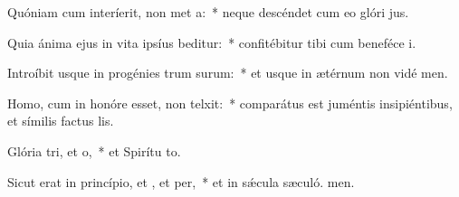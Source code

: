 \item Quóniam cum interíerit, non met a:~* neque descéndet cum eo glóri jus.
\item Quia ánima ejus in vita ipsíus beditur:~* confitébitur tibi cum beneféce i.
\item Introíbit usque in progénies trum surum:~* et usque in ætérnum non vidé men.
\item Homo, cum in honóre esset, non telxit:~* comparátus est juméntis insipiéntibus, et símilis factus  lis.
\item Glória tri, et o,~* et Spirítu to.
\item Sicut erat in princípio, et , et per,~* et in sǽcula sæculó. men.
